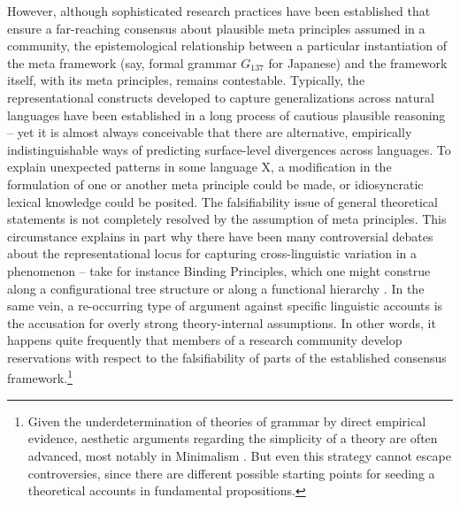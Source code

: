 \documentclass[output=paper,hidelinks]{langscibook}
\begin{document}
However, although sophisticated research practices have been established that ensure a far-reaching consensus about plausible meta principles assumed in a community, the epistemological relationship between a particular instantiation of the meta framework (say, formal grammar $G_{137}$ for Japanese) and the framework itself, with its meta principles, remains contestable. Typically, the representational constructs developed to capture generalizations across natural languages have been established in a long process of cautious plausible reasoning -- yet it is almost always conceivable that there are alternative, empirically indistinguishable ways of predicting surface-level divergences across languages. To explain unexpected patterns in some language X, a modification in the formulation of one or another meta principle could be made, or idiosyncratic lexical knowledge could be posited.
The falsifiability issue of general theoretical statements is not completely resolved by the assumption of meta principles. This circumstance explains in part why there have been many controversial debates about the representational locus for capturing cross-linguistic variation in a phenomenon -- take for instance Binding Principles, which one might construe along a configurational tree structure or along a functional hierarchy \citep{AsudehDalrymple2006}. In the same vein, a re-occurring type of argument against specific linguistic accounts is the accusation for overly strong theory-internal assumptions. In other words, it happens quite frequently that members of a research community develop reservations with respect to the falsifiability of parts of the established consensus framework.\footnote{Given the underdetermination of theories of grammar by direct empirical evidence, aesthetic arguments regarding the simplicity of a theory are often advanced, most notably in Minimalism \citep{chomsky1995the-minimalist}. But even this strategy cannot escape controversies, since there are different possible starting points for seeding a theoretical accounts in fundamental propositions.}
\end{document}
